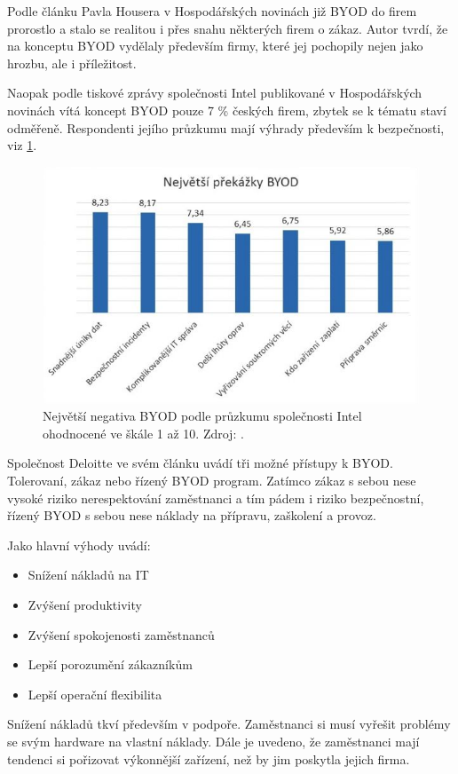 Podle článku Pavla Housera v Hospodářských novinách \cite{HNBYOD}
již BYOD do firem prorostlo a stalo se realitou i přes snahu některých firem o zákaz. Autor tvrdí, že na konceptu BYOD vydělaly především firmy, které jej pochopily nejen jako hrozbu, ale i příležitost. 

Naopak podle tiskové zprávy společnosti Intel publikované v Hospodářských novinách \cite{IntelBYOD} vítá koncept BYOD pouze 7 \% českých firem, zbytek se k tématu staví odměřeně. Respondenti jejího průzkumu mají výhrady především k bezpečnosti, viz \ref{intelBYOD}.

\begin{figure}[h!]\label{intelBYOD}
\centering
\includegraphics[width=12cm]{img/intelBYOD}
\caption{Největší negativa BYOD podle průzkumu společnosti Intel ohodnocené ve škále 1 až 10. Zdroj: \cite{IntelBYOD}.} 
\end{figure}

Společnost Deloitte ve svém článku  \cite{DeloitteBYOD} uvádí tři možné přístupy k BYOD. Tolerovaní, zákaz nebo řízený BYOD program. Zatímco zákaz s sebou nese vysoké riziko nerespektování zaměstnanci a tím pádem i riziko bezpečnostní, řízený BYOD s sebou nese náklady na přípravu, zaškolení a provoz.

Jako hlavní výhody uvádí:
\begin{itemize}
\item Snížení nákladů na IT
\item Zvýšení produktivity
\item Zvýšení spokojenosti zaměstnanců
\item Lepší porozumění zákazníkům
\item Lepší operační flexibilita
\end{itemize}

Snížení nákladů tkví především v podpoře. Zaměstnanci si musí vyřešit problémy se svým hardware na vlastní náklady. Dále je uvedeno, že zaměstnanci mají tendenci si pořizovat výkonnější zařízení, než by jim poskytla jejich firma. 

